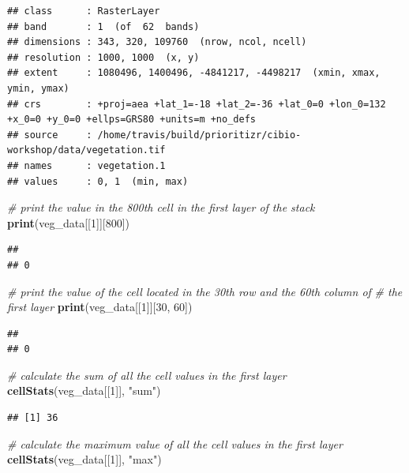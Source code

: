 \documentclass[12pt,]{book}
\newenvironment{Shaded}{\begin{snugshade}}{\end{snugshade}}
\newcommand{\KeywordTok}[1]{\textcolor[rgb]{0.13,0.29,0.53}{\textbf{#1}}}
\newcommand{\DecValTok}[1]{\textcolor[rgb]{0.00,0.00,0.81}{#1}}
\newcommand{\StringTok}[1]{\textcolor[rgb]{0.31,0.60,0.02}{#1}}
\newcommand{\CommentTok}[1]{\textcolor[rgb]{0.56,0.35,0.01}{\textit{#1}}}
\newcommand{\NormalTok}[1]{#1}
\begin{document}
\begin{verbatim}
## class      : RasterLayer 
## band       : 1  (of  62  bands)
## dimensions : 343, 320, 109760  (nrow, ncol, ncell)
## resolution : 1000, 1000  (x, y)
## extent     : 1080496, 1400496, -4841217, -4498217  (xmin, xmax, ymin, ymax)
## crs        : +proj=aea +lat_1=-18 +lat_2=-36 +lat_0=0 +lon_0=132 +x_0=0 +y_0=0 +ellps=GRS80 +units=m +no_defs 
## source     : /home/travis/build/prioritizr/cibio-workshop/data/vegetation.tif 
## names      : vegetation.1 
## values     : 0, 1  (min, max)
\end{verbatim}

\begin{Shaded}
\begin{Highlighting}[]
\CommentTok{# print the value in the 800th cell in the first layer of the stack}
\KeywordTok{print}\NormalTok{(veg_data[[}\DecValTok{1}\NormalTok{]][}\DecValTok{800}\NormalTok{])}
\end{Highlighting}
\end{Shaded}

\begin{verbatim}
##   
## 0
\end{verbatim}

\begin{Shaded}
\begin{Highlighting}[]
\CommentTok{# print the value of the cell located in the 30th row and the 60th column of}
\CommentTok{# the first layer}
\KeywordTok{print}\NormalTok{(veg_data[[}\DecValTok{1}\NormalTok{]][}\DecValTok{30}\NormalTok{, }\DecValTok{60}\NormalTok{])}
\end{Highlighting}
\end{Shaded}

\begin{verbatim}
##   
## 0
\end{verbatim}

\begin{Shaded}
\begin{Highlighting}[]
\CommentTok{# calculate the sum of all the cell values in the first layer}
\KeywordTok{cellStats}\NormalTok{(veg_data[[}\DecValTok{1}\NormalTok{]], }\StringTok{"sum"}\NormalTok{)}
\end{Highlighting}
\end{Shaded}

\begin{verbatim}
## [1] 36
\end{verbatim}

\begin{Shaded}
\begin{Highlighting}[]
\CommentTok{# calculate the maximum value of all the cell values in the first layer}
\KeywordTok{cellStats}\NormalTok{(veg_data[[}\DecValTok{1}\NormalTok{]], }\StringTok{"max"}\NormalTok{)}
\end{Highlighting}
\end{Shaded}
\end{document}
